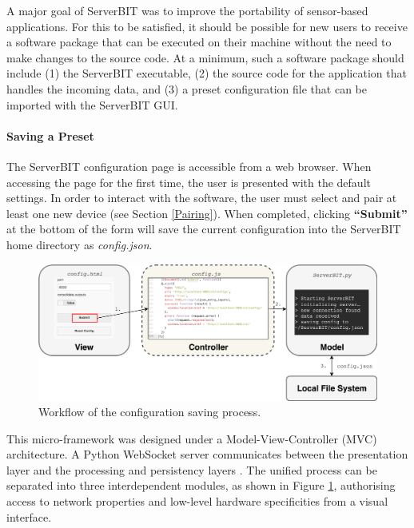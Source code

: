 A major goal of ServerBIT was to improve the portability of sensor-based applications. For this to be satisfied, it should be possible for new users to receive a software package that can be executed on their machine without the need to make changes to the source code. At a minimum, such a software package should include (1) the ServerBIT executable, (2) the source code for the application that handles the incoming data, and (3) a preset configuration file that can be imported with the ServerBIT GUI.

\paragraph{Saving a Preset}

The ServerBIT configuration page is accessible from a web browser. When accessing the page for the first time, the user is presented with the default settings. In order to interact with the software, the user must select and pair at least one new device (see Section \ref{Pairing}). When completed, clicking \textbf{``Submit''} at the bottom of the form will save the current configuration into the ServerBIT home directory as \textit{config.json}.

\begin{figure}[htb!]
    \centering
    \includegraphics[width=\textwidth]{Chapters/Figures/technical/ServerBIT/Websockets_ctrl.png}
    \caption{Workflow of the configuration saving process.}
    \label{fig:MVC_Diagram}
\end{figure}

This micro-framework was designed under a Model-View-Controller (MVC) architecture. A Python WebSocket server communicates between the presentation layer and the processing and persistency layers \cite{da_silva_web-based_2012}. The unified process can be separated into three interdependent modules, as shown in Figure \ref{fig:MVC_Diagram}, authorising access to network properties and low-level hardware specificities from a visual interface.

